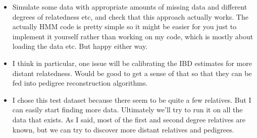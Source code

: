 \documentclass[10pt,a4]{article}
\begin{document}
\begin{itemize}
\item
  Simulate some data with appropriate amounts of missing data and different degrees of relatedness etc, and check that this approach actually works. The actually HMM code is pretty simple so it might be easier for you just to implement it yourself rather than working on my code, which is mostly about loading the data etc. But happy either way.
\item
  I think in particular, one issue will be calibrating the IBD estimates for more distant relatedness. Would be good to get a sense of that so that they can be fed into pedigree reconstruction algorithms.
\item
  I chose this test dataset because there seem to be quite a few relatives. But I can easily start finding more data. Ultimately we'll try to run it on all the data that exists. As I said, most of the first and second degree relatives are known, but we can try to discover more distant relatives and pedigrees.
 
\end{itemize}
\end{document}
